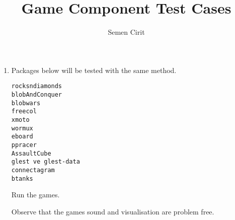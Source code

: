 \documentclass[a4paper,10pt]{article}
\title{Game Component Test Cases }
\author{Semen Cirit}
\begin{document}
\maketitle

\begin{enumerate}
\item Packages below will be tested with the same method.
\begin{verbatim}
rocksndiamonds 
blobAndConquer
blobwars
freecol
xmoto
wormux
eboard
ppracer
AssaultCube
glest ve glest-data
connectagram
btanks
\end{verbatim}

Run the games.

Observe that the games sound and visualisation are problem free.
\end{enumerate}
\end{document}
